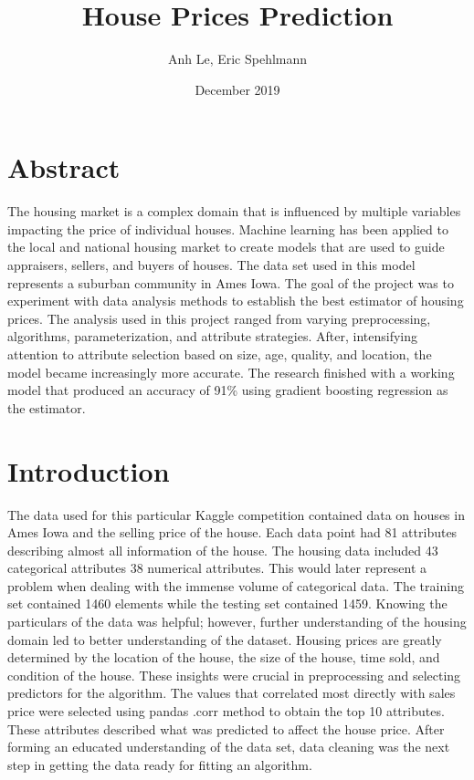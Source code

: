 \documentclass[letterpaper,10pt]{article}
\title{House Prices Prediction}
\author{Anh Le, Eric Spehlmann }
\date{December 2019}
\begin{document}
\maketitle
\renewcommand{\thesection}{\Roman{section}} 
\section{Abstract}
The housing market is a complex domain that is influenced by multiple variables impacting the price of individual houses. Machine learning has been applied to the local and national housing market to create models that are used to guide appraisers, sellers, and buyers of houses. The data set used in this model represents a suburban community in Ames Iowa. The goal of the project was to experiment with data analysis methods to establish the best estimator of housing prices.  The analysis used in this project ranged from varying preprocessing, algorithms, parameterization, and attribute strategies. After, intensifying attention to attribute selection based on size, age, quality, and location, the model became increasingly more accurate. The research finished with a working model that produced an accuracy of 91\% using gradient boosting regression as the estimator.	

\section{Introduction}
The data used for this particular Kaggle competition contained data on houses in Ames Iowa and the selling price of the house. Each data point had 81 attributes describing almost all information of the house. The housing data included 43 categorical attributes 38 numerical attributes. This would later represent a problem when dealing with the immense volume of categorical data. The training set contained 1460 elements while the testing set contained 1459. Knowing the particulars of the data was helpful; however, further understanding of the housing domain led to better understanding of the dataset. Housing prices are greatly determined by the location of the house, the size of the house, time sold, and condition of the house. These insights were crucial in preprocessing and selecting predictors for the algorithm. The values that correlated most directly with sales price were selected using pandas .corr method to obtain the top 10 attributes. These attributes described what was predicted to affect the house price. After forming an educated understanding of the data set, data cleaning was the next step in getting the data ready for fitting an algorithm.  
\end{document}
